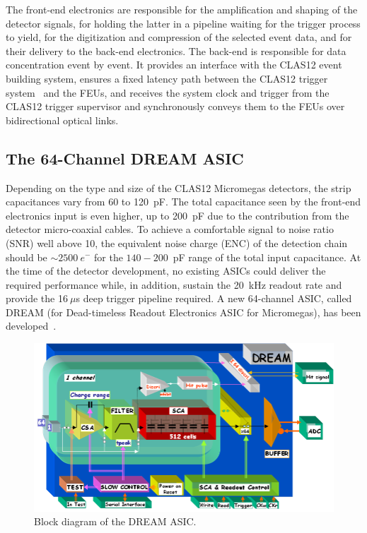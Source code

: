 The front-end electronics are responsible for the amplification and shaping of the detector signals, for holding the latter in a
pipeline waiting for the trigger process to yield, for the digitization and compression of the selected event data, and for their
delivery to the back-end electronics. The back-end is responsible for data concentration event by event. It provides an interface
with the CLAS12 event building system, ensures a fixed latency path between the CLAS12 trigger system~\cite{nim:trig} and
the FEUs, and receives the system clock and trigger from the CLAS12 trigger supervisor and synchronously conveys them to the
FEUs over bidirectional optical links.

\subsection{The 64-Channel DREAM ASIC}

Depending on the type and size of the CLAS12 Micromegas detectors, the strip capacitances vary from 60 to 120~pF. The total
capacitance seen by the front-end electronics input is even higher, up to 200~pF due to the contribution from the detector
micro-coaxial cables. To achieve a comfortable signal to noise ratio (SNR) well above 10, the equivalent noise charge (ENC) of the
detection chain should be $\sim2500~e^-$ for the $140-200$~pF range of the total input capacitance. At the time of the
detector development, no existing ASICs could deliver the required performance while, in addition, sustain the 20~kHz readout
rate and provide the 16$~\mu$s deep trigger pipeline required. A new 64-channel ASIC, called DREAM (for Dead-timeless
Readout Electronics ASIC for Micromegas), has been developed~\cite{DRM}. 

\begin{figure}[htb]
 \includegraphics[width=1.0\columnwidth,keepaspectratio]{images/electronics_fig2.png}
 \caption{Block diagram of the DREAM ASIC.}
 \label{fig:mm-e_2}
\end{figure}


